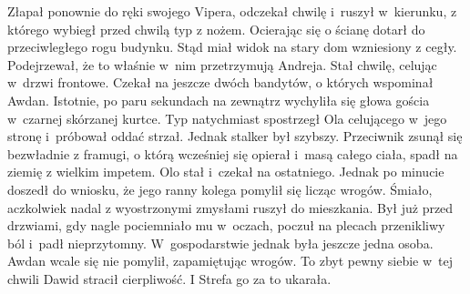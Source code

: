 \documentclass[../MAIN.tex]{subfiles}
\begin{document}
\pp
Złapał ponownie do ręki swojego Vipera, odczekał chwilę i~ruszył w~kierunku, z którego wybiegł przed chwilą typ z nożem. Ocierając się o ścianę dotarł do przeciwległego rogu budynku. Stąd miał widok na stary dom wzniesiony z cegły. Podejrzewał, że to właśnie w~nim przetrzymują Andreja. Stał chwilę, celując w~drzwi frontowe. Czekał na jeszcze dwóch bandytów, o których wspominał Awdan. Istotnie, po paru sekundach na zewnątrz wychyliła się głowa gościa w~czarnej skórzanej kurtce. Typ natychmiast spostrzegł Ola celującego w~jego stronę i~próbował oddać strzał. Jednak stalker był szybszy. Przeciwnik zsunął się bezwładnie z framugi, o którą wcześniej się opierał i~masą całego ciała, spadł na ziemię z wielkim impetem. Olo stał i~czekał na ostatniego. Jednak po minucie doszedł do wniosku, że jego ranny kolega pomylił się licząc wrogów. Śmiało, aczkolwiek nadal z wyostrzonymi zmysłami ruszył do mieszkania. Był już przed drzwiami, gdy nagle pociemniało mu w~oczach, poczuł na plecach przenikliwy ból i~padł nieprzytomny.
 W~gospodarstwie jednak była jeszcze jedna osoba. Awdan wcale się nie pomylił, zapamiętując wrogów. To zbyt pewny siebie w~tej chwili Dawid stracił cierpliwość. I Strefa go za to ukarała.
\end{document}
